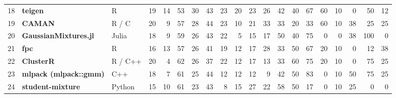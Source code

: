 \documentclass[10pt,a4paper]{article}
\begin{document}
\begin{landscape}
{\begin{longtable}{@{}r l l r r r r r r r *{10}{r}@{}}
18 & \textbf{teigen} & R & 19 & 14 & 53 & \cellcolor{hm!26}30 & \cellcolor{hm!35}43 & \cellcolor{hm!21}23 & \cellcolor{hm!19}20 & \cellcolor{hm!21}23 & \cellcolor{hm!23}26 & \cellcolor{hm!34}42 & \cellcolor{hm!33}40 & \cellcolor{hm!52}67 & \cellcolor{hm!47}60 & \cellcolor{hm!12}10 & \cellcolor{hm!5}0 & \cellcolor{hm!40}50 & \cellcolor{hm!14}12 \\
19 & \textbf{CAMAN} & R / C & 20 & 9 & 57 & \cellcolor{hm!25}28 & \cellcolor{hm!36}44 & \cellcolor{hm!21}23 & \cellcolor{hm!12}10 & \cellcolor{hm!20}21 & \cellcolor{hm!28}33 & \cellcolor{hm!28}33 & \cellcolor{hm!19}20 & \cellcolor{hm!28}33 & \cellcolor{hm!47}60 & \cellcolor{hm!12}10 & \cellcolor{hm!31}38 & \cellcolor{hm!22}25 & \cellcolor{hm!22}25 \\
20 & \textbf{GaussianMixtures.jl} & Julia & 18 & 9 & 59 & \cellcolor{hm!23}26 & \cellcolor{hm!35}43 & \cellcolor{hm!20}22 & \cellcolor{hm!8}5 & \cellcolor{hm!15}15 & \cellcolor{hm!17}17 & \cellcolor{hm!40}50 & \cellcolor{hm!33}40 & \cellcolor{hm!58}75 & \cellcolor{hm!5}0 & \cellcolor{hm!5}0 & \cellcolor{hm!31}38 & \cellcolor{hm!75}100 & \cellcolor{hm!5}0 \\
21 & \textbf{fpc} & R & 16 & 13 & 57 & \cellcolor{hm!23}26 & \cellcolor{hm!34}41 & \cellcolor{hm!18}19 & \cellcolor{hm!14}12 & \cellcolor{hm!17}17 & \cellcolor{hm!25}28 & \cellcolor{hm!28}33 & \cellcolor{hm!40}50 & \cellcolor{hm!52}67 & \cellcolor{hm!19}20 & \cellcolor{hm!12}10 & \cellcolor{hm!5}0 & \cellcolor{hm!14}12 & \cellcolor{hm!31}38 \\
22 & \textbf{ClusterR} & R / C++ & 20 & 4 & 62 & \cellcolor{hm!23}26 & \cellcolor{hm!31}37 & \cellcolor{hm!20}22 & \cellcolor{hm!14}12 & \cellcolor{hm!17}17 & \cellcolor{hm!14}13 & \cellcolor{hm!28}33 & \cellcolor{hm!47}60 & \cellcolor{hm!58}75 & \cellcolor{hm!19}20 & \cellcolor{hm!12}10 & \cellcolor{hm!5}0 & \cellcolor{hm!58}75 & \cellcolor{hm!22}25 \\
23 & \textbf{mlpack (mlpack::gmm)} & C++ & 18 & 7 & 61 & \cellcolor{hm!22}25 & \cellcolor{hm!36}44 & \cellcolor{hm!14}12 & \cellcolor{hm!14}12 & \cellcolor{hm!14}12 & \cellcolor{hm!11}9 & \cellcolor{hm!34}42 & \cellcolor{hm!40}50 & \cellcolor{hm!63}83 & \cellcolor{hm!5}0 & \cellcolor{hm!12}10 & \cellcolor{hm!40}50 & \cellcolor{hm!58}75 & \cellcolor{hm!22}25 \\
24 & \textbf{student-mixture} & Python & 15 & 10 & 61 & \cellcolor{hm!21}23 & \cellcolor{hm!35}43 & \cellcolor{hm!10}8 & \cellcolor{hm!16}15 & \cellcolor{hm!24}27 & \cellcolor{hm!20}22 & \cellcolor{hm!46}58 & \cellcolor{hm!40}50 & \cellcolor{hm!17}17 & \cellcolor{hm!5}0 & \cellcolor{hm!12}10 & \cellcolor{hm!22}25 & \cellcolor{hm!5}0 & \cellcolor{hm!5}0 \\

\end{longtable}}
\end{landscape}
\end{document}
